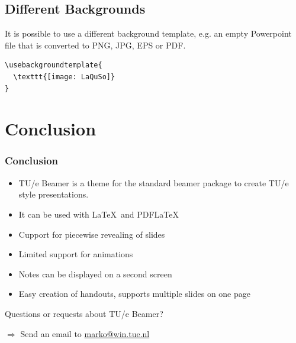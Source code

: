 \documentclass[t]{beamer}
\begin{document}
\subsection{Different Backgrounds}
\begin{frame}[fragile]

\color{white}
It is possible to use a different background template, e.g. an empty Powerpoint file that is converted to PNG, JPG, EPS or PDF.

\begin{lstlisting}
\usebackgroundtemplate{
  \texttt{[image: LaQuSo]}
}
\end{lstlisting}

\end{frame}

\usebackgroundtemplate{\tuebackgroundtemplate}
\section{Conclusion}
\begin{frame}
\frametitle{Conclusion}

\begin{itemize}
\item TU/e Beamer is a theme for the standard {\sf beamer} package to create TU/e style presentations.
\item It can be used with \LaTeX\ and PDF\LaTeX
\item Cupport for piecewise revealing of slides
\item Limited support for animations
\item Notes can be displayed on a second screen
\item Easy creation of handouts, supports multiple slides on one page
\end{itemize}

Questions or requests about TU/e Beamer?

$\Longrightarrow$ Send an email to \href{mailto:marko@win.tue.nl}{marko@win.tue.nl}
\end{frame}
\end{document}
